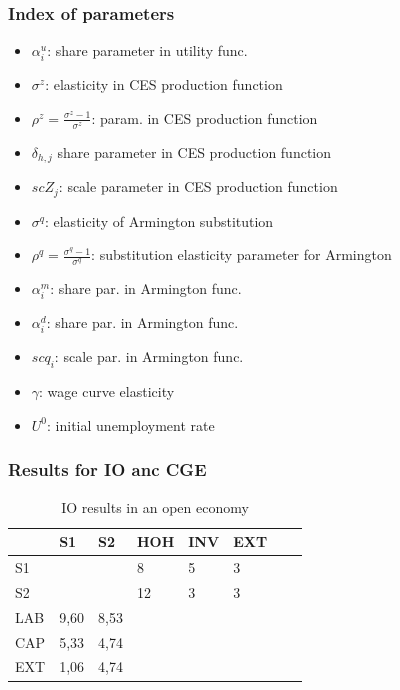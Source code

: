 \subsubsection{Index of parameters}
\begin{itemize}
	\item $\alpha^u_i$: share parameter in utility func.
	\item $\sigma^z$: elasticity in CES production function
	\item $\rho^z = \frac{\sigma^z - 1}{\sigma^z}$: param. in CES production function
	\item $\delta_{h,j}$ share parameter in CES production function
	\item $scZ_j$: scale parameter in CES production function  
	\item $\sigma^q$: elasticity of Armington substitution
	\item $\rho^q = \frac{\sigma^q-1}{\sigma^q}$: substitution elasticity parameter for Armington
	\item $\alpha^m_i$: share par. in Armington func.
	\item $\alpha^d_i$: share par. in Armington func.
	\item $scq_i$: scale par. in Armington func.
	\item $\gamma$: wage curve elasticity
	\item $U^0$: initial unemployment rate
\end{itemize}


\subsubsection{Results for IO anc CGE}
\label{subsec:open_economy_results}

\begin{table}[!h]
	\centering
	\caption{IO results in an open economy}
	\label{tab:SAM_IO_openEconomy}
	\begin{tabular}{llllllll}
		\toprule
		& S1 & S2 &  HOH & INV & EXT \\
		\midrule
		S1 &  &   & 8 & 5 & 3 \\
		S2 &  &    & 12 & 3 & 3 \\
		LAB & 9,60 & 8,53 &   &  &  \\
		CAP & 5,33 & 4,74 &   &  &  \\
		EXT & 1,06 & 4,74 &   &  &  \\
		\bottomrule
	\end{tabular}
\end{table}


